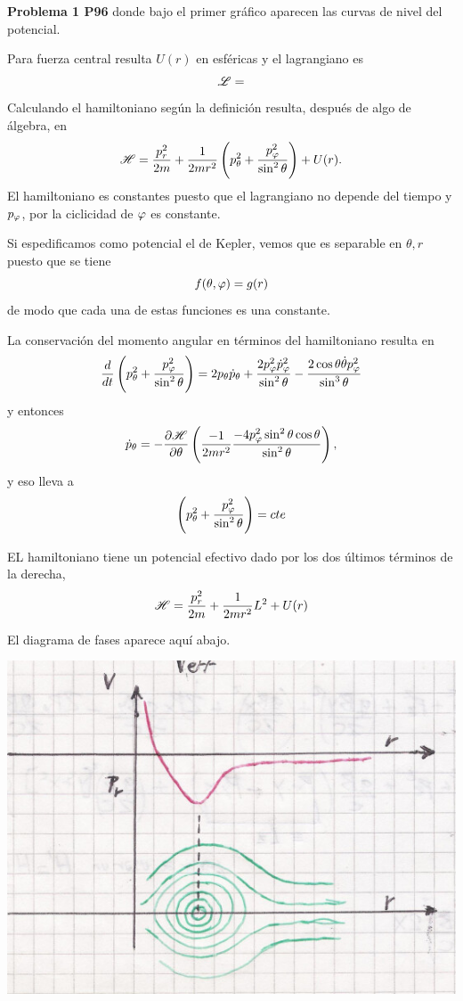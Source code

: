 \documentclass[10pt,oneside]{CBFT_book}
\begin{document}
\begin{ejemplo}{\bf Problema 1 P96}
donde bajo el primer gráfico aparecen las curvas de nivel del potencial.

Para fuerza central resulta $U(r)$ en esféricas y el lagrangiano es
\[
	\mathscr{L} =
\]
Calculando el hamiltoniano según la definición resulta, después de algo de álgebra, en
\[
	\mathscr{H} = \frac{p_r^2}{2m} + \frac{1}{2mr^2} \left( p_\theta^2 + \frac{p_\varphi^2}{\sin^2\theta}\right) + U(r) .
\]
El hamiltoniano es constantes puesto que el lagrangiano no depende del tiempo y $p_\varphi$, por la ciclicidad de $\varphi$
es constante.

Si espedificamos como potencial el de Kepler, vemos que es separable en $\theta, r$ puesto que se tiene 
\[
	f(\theta,\varphi) = g(r)
\]
de modo que cada una de estas funciones es una constante.

La conservación del momento angular en términos del hamiltoniano resulta en
\[
	\frac{d^{\hspace{-0.05em}} {}}{d {t}^{\hspace{-0.05em}}} \left( p_\theta^2 + \frac{p_\varphi^2}{\sin^2\theta}\right) = 2 p_\theta \dot{p}_\theta +
	\frac{ 2 p_\varphi^2 \dot{p}_\varphi^2}{\sin^2\theta} - \frac{2\cos\theta\dot{\theta}p_\varphi^2}{\sin^3\theta}
\]
y entonces
\[
	\dot{p}_\theta = -\frac{\partial^{\hspace{-0.05em}} {\mathscr{H}}}{\partial {\theta}^{\hspace{-0.05em}}} \left( \frac{-1}{2mr^2} \frac{-4p_\varphi^2 \sin^2\theta \cos\theta}{\sin^2\theta} \right),
\]
y eso lleva a 
\[
	 \left( p_\theta^2 + \frac{p_\varphi^2}{\sin^2\theta}\right) = cte
\]

EL hamiltoniano tiene un potencial efectivo dado por los dos últimos términos de la derecha,
\[
	\mathscr{H} = \frac{p_r^2}{2m} + \frac{1}{2mr^2} L^2 + U(r)
\]

El diagrama de fases aparece aquí abajo.

\includegraphics[scale=0.35]{images/fig_mc_problema_1_p96_2.jpg} 
 
\end{ejemplo}
\end{document}
